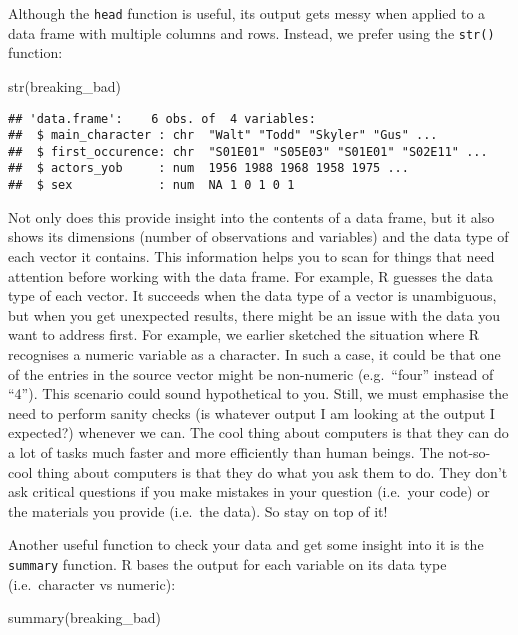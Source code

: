 \documentclass[
]{article}
\newenvironment{Shaded}{\begin{snugshade}}{\end{snugshade}}
\newcommand{\FunctionTok}[1]{\textcolor[rgb]{0.00,0.00,0.00}{#1}}
\newcommand{\NormalTok}[1]{#1}
\begin{document}
Although the \texttt{head} function is useful, its output gets messy
when applied to a data frame with multiple columns and rows. Instead, we
prefer using the \texttt{str()} function:

\begin{Shaded}
\begin{Highlighting}[]
\FunctionTok{str}\NormalTok{(breaking\_bad)}
\end{Highlighting}
\end{Shaded}

\begin{verbatim}
## 'data.frame':    6 obs. of  4 variables:
##  $ main_character : chr  "Walt" "Todd" "Skyler" "Gus" ...
##  $ first_occurence: chr  "S01E01" "S05E03" "S01E01" "S02E11" ...
##  $ actors_yob     : num  1956 1988 1968 1958 1975 ...
##  $ sex            : num  NA 1 0 1 0 1
\end{verbatim}

Not only does this provide insight into the contents of a data frame,
but it also shows its dimensions (number of observations and variables)
and the data type of each vector it contains. This information helps you
to scan for things that need attention before working with the data
frame. For example, R guesses the data type of each vector. It succeeds
when the data type of a vector is unambiguous, but when you get
unexpected results, there might be an issue with the data you want to
address first. For example, we earlier sketched the situation where R
recognises a numeric variable as a character. In such a case, it could
be that one of the entries in the source vector might be non-numeric
(e.g.~``four'' instead of ``4''). This scenario could sound hypothetical
to you. Still, we must emphasise the need to perform sanity checks (is
whatever output I am looking at the output I expected?) whenever we can.
The cool thing about computers is that they can do a lot of tasks much
faster and more efficiently than human beings. The not-so-cool thing
about computers is that they do what you ask them to do. They don't ask
critical questions if you make mistakes in your question (i.e.~your
code) or the materials you provide (i.e.~the data). So stay on top of
it!

Another useful function to check your data and get some insight into it
is the \texttt{summary} function. R bases the output for each variable
on its data type (i.e.~character vs numeric):

\begin{Shaded}
\begin{Highlighting}[]
\FunctionTok{summary}\NormalTok{(breaking\_bad)}
\end{Highlighting}
\end{Shaded}
\end{document}
